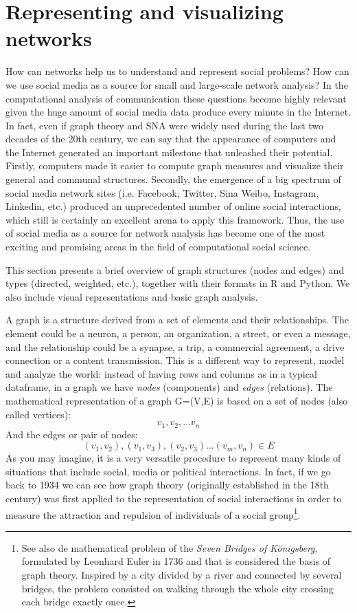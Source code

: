\section{Representing and visualizing networks}
\label{sec:graph}

How can networks help us to understand and represent social problems? How can we use social media as a source for small and large-scale network analysis? In the computational analysis of communication these questions become highly relevant given the huge amount of social media data produce every minute in the Internet. In fact, even if graph theory and SNA were widely used during the last two decades of the 20th century, we can say that the appearance of computers and the Internet generated an important milestone that unleashed their potential. Firstly, computers made it easier to compute graph measures and visualize their general and communal structures. Secondly, the emergence of a big spectrum of social media network sites (i.e. Facebook, Twitter, Sina Weibo, Instagram, Linkedin, etc.) produced an unprecedented number of online social interactions, which still is certainly an excellent arena to apply this framework. Thus, the use of social media as a source for network analysis has become one of the most exciting and promising areas in the field of computational social science.

This section presents a brief overview of graph structures (nodes and edges) and types (directed, weighted, etc.), together with their formats in R and Python. We also include visual representations and basic graph analysis.  
 
A graph is a structure derived from a set of elements and their relationships. The element could be a neuron, a person, an organization, a street, or even a message, and the relationship could be a synapse, a trip, a commercial agreement, a drive connection or a content transmission. This is a different way to represent, model and analyze the world: instead of having rows and columns as in a typical dataframe, in a graph we have \textit{nodes} (components) and \textit{edges} (relations). The mathematical representation of a graph G=(V,E) is based on a set of nodes (also called vertices): \[{v_{1}, v_{2},… v_{n}}\] And the edges or pair of nodes: \[{(v_{1}, v_{2}), (v_{1}, v_{3}), (v_{2},v_{3}) … (v_{m}, v_{n}) \in E}\] As you may imagine, it is a very versatile procedure to represent many kinds of situations that include social, media or political interactions. In fact, if we go back to 1934 we can see how graph theory (originally established in the 18th century) was first applied to the representation of social interactions \citep{moreno1934shall} in order to measure the attraction and repulsion of individuals of a social group\footnote{See also de mathematical problem of the \textit{Seven Bridges of Königsberg}, formulated by Leonhard Euler in 1736 and that is considered the basis of graph theory. Inspired by a city divided by a river and connected by several bridges, the problem consisted on walking through the whole city crossing each bridge exactly once.}.

